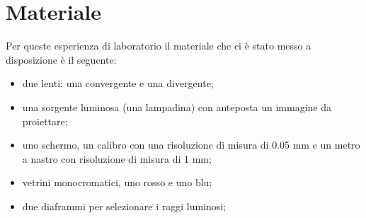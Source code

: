 \section{Materiale}

Per queste esperienza di laboratorio il materiale che ci è stato messo a disposizione è il seguente:
\begin{itemize}
	\item{due lenti: una convergente e una divergente;}
	\item{una sorgente luminosa (una lampadina) con anteposta un immagine da proiettare;}
	\item{uno schermo, un calibro con una risoluzione di misura di 0.05 mm e un metro a nastro con risoluzione di misura di 1 mm;}
	\item{vetrini monocromatici, uno rosso e uno blu;}
	\item{due diaframmi per selezionare i raggi luminosi;}
\end{itemize}
